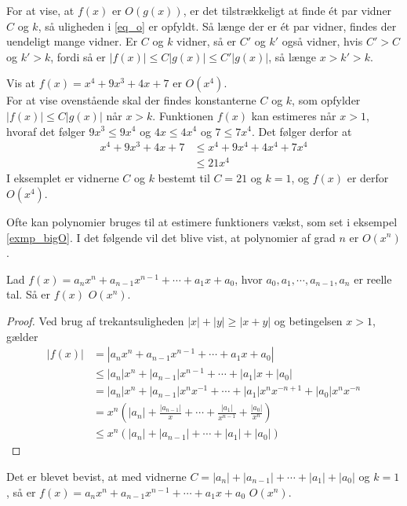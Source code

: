 For at vise, at $f(x)$ er $O(g(x))$, er det tilstrækkeligt at finde ét par vidner $C$ og $k$, så uligheden i \eqref{eq_o} er opfyldt. Så længe der er ét par vidner, findes der uendeligt mange vidner. Er $C$ og $k$ vidner, så er $C'$ og $k'$ også vidner, hvis $C'>C$ og $k'>k$, fordi så er $|f(x)| \leq C |g(x)| \leq C' |g(x)| $, så længe $x>k'>k$.  

\begin{exmp}\label{exmp_bigO}
Vis at $f(x)=x^4+9x^3+4x+7$ er $O(x^4)$. \\
For at vise ovenstående skal der findes konstanterne $C$ og $k$, som opfylder $|f(x)| \leq C |g(x)|$ når $x>k$. Funktionen $f(x)$ kan estimeres når $x>1$, hvoraf det følger $9x^3\leq 9x^4$ og $4x\leq 4x^4$ og $7\leq 7x^4$. Det følger derfor at 
\begin{align*}
x^4+9x^3+4x+7 &\leq x^4+9x^4+4x^4+7x^4 \\
&\leq 21x^4
\end{align*}
I eksemplet er vidnerne $C$ og $k$ bestemt til $C=21$ og $k=1$, og $f(x)$ er derfor $O(x^4)$. 
\end{exmp} 
Ofte kan polynomier bruges til at estimere funktioners vækst, som set i eksempel \ref{exmp_bigO}. 
I det følgende vil det blive vist, at polynomier af grad $n$ er $O(x^n)$. \\
\begin{thm}
Lad $f(x)=a_nx^n+a_{n-1}x^{n-1}+\cdots +a_1x+a_0$, hvor $a_0, a_1, \cdots, a_{n-1}, a_n$ er reelle tal. 
Så er $f(x)$ $O(x^n)$.
\end{thm}

\begin{proof}
Ved brug af trekantsuligheden $|x| + |y| \geq |x + y|$ og betingelsen $x>1$, gælder
	\begin{align*}
		|f(x)| &= |a_nx^n+a_{n-1}x^{n-1}+ \cdots +a_1x+a_0| \\
		&\leq |a_n|x^n + |a_{n-1}| x^{n-1}+ \cdots + |a_1| x +|a_0| \\
		&= |a_n| x^n + |a_{n-1}| x^nx^{-1}+ \cdots + |a_1| x^n x^{-n+1}+|a_0| x^nx^{-n} \\
		&= x^n \left(|a_n| + \frac{|a_{n-1}|}{x}+ \cdots +\frac{|a_1|}{x^{n-1}}+\frac{|a_0|}{x^n} \right) \\
		&\leq x^n(|a_n| + |a_{n-1}| + \cdots + |a_1| + |a_0| )
	\end{align*}
\end{proof}
Det er blevet bevist, at med vidnerne $C= |a_n| + |a_{n-1}| + \cdots + |a_1| + |a_0|$ og $k=1$, så er $f(x)=a_nx^n+a_{n-1}x^{n-1}+\cdots +a_1x+a_0$ $O(x^n)$. \\

